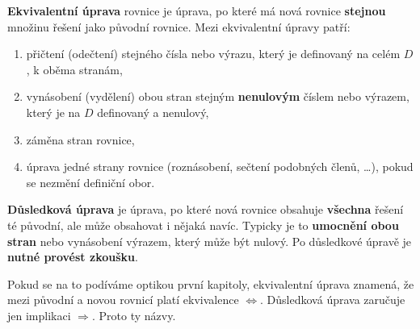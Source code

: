 \begin{definitionbox}
  \textbf{Ekvivalentní úprava} rovnice je úprava, po které má nová rovnice \textbf{stejnou} množinu řešení jako původní rovnice. Mezi ekvivalentní úpravy patří:
  \begin{enumerate}
    \item přičtení (odečtení) stejného čísla nebo výrazu, který je definovaný na celém $D$, k oběma stranám,
    \item vynásobení (vydělení) obou stran stejným \textbf{nenulovým} číslem nebo výrazem, který je na $D$ definovaný a nenulový,
    \item záměna stran rovnice,
    \item úprava jedné strany rovnice (roznásobení, sečtení podobných členů, \ldots), pokud se nezmění definiční obor.
  \end{enumerate}

  \textbf{Důsledková úprava} je úprava, po které nová rovnice obsahuje \textbf{všechna} řešení té původní, ale může obsahovat i nějaká navíc. Typicky je to \textbf{umocnění obou stran} nebo vynásobení výrazem, který může být nulový. Po důsledkové úpravě je \textbf{nutné provést zkoušku}.
\end{definitionbox}

Pokud se na to podíváme optikou první kapitoly, ekvivalentní úprava znamená, že mezi původní a novou rovnicí platí ekvivalence $\Leftrightarrow$. Důsledková úprava zaručuje jen implikaci $\Rightarrow$. Proto ty názvy.

